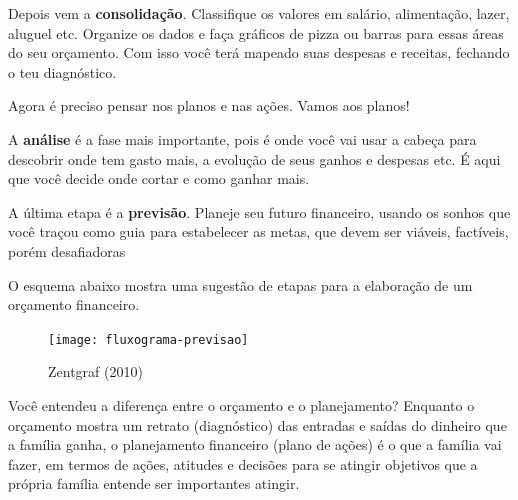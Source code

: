Depois vem a \textbf{consolidação}. Classifique os valores em salário, alimentação, lazer, aluguel etc. Organize os dados e faça gráficos de pizza ou barras para essas áreas do seu orçamento. Com isso você terá mapeado suas despesas e receitas, fechando o teu diagnóstico.

Agora é preciso pensar nos planos e nas ações. Vamos aos planos!

A \textbf{análise} é a fase mais importante, pois é onde você vai usar a cabeça para descobrir onde tem gasto mais, a evolução de seus ganhos e despesas etc. É aqui que você decide onde cortar e como ganhar mais.   

A última etapa é a \textbf{previsão}. Planeje seu futuro financeiro, usando os sonhos que você traçou como guia para estabelecer as metas, que devem ser viáveis, factíveis, porém desafiadoras

O esquema abaixo mostra uma sugestão de etapas para a elaboração de um orçamento financeiro. 

\begin{figure}[H]
\centering
\texttt{[image: fluxograma-previsao]}

\caption{Zentgraf (2010)}
\end{figure}

Você entendeu a diferença entre o orçamento e o planejamento? Enquanto o orçamento mostra um retrato (diagnóstico) das entradas e saídas do dinheiro que a família ganha, o planejamento financeiro (plano de ações) é o que a família vai fazer, em termos de ações, atitudes e decisões para se atingir objetivos que a própria família entende ser importantes atingir. 

